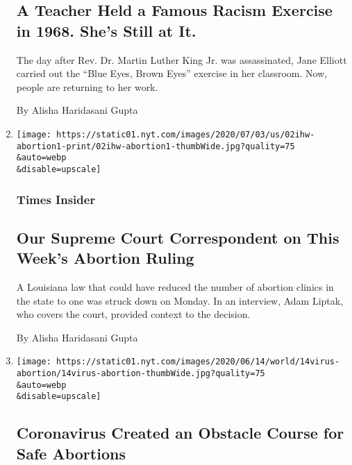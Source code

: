 \begin{enumerate}
  \hypertarget{a-teacher-held-a-famous-racism-exercise-in-1968-shes-still-at-it}{%
  \subsection{A Teacher Held a Famous Racism Exercise in 1968. She's
  Still at
  It.}\label{a-teacher-held-a-famous-racism-exercise-in-1968-shes-still-at-it}}

  The day after Rev. Dr. Martin Luther King Jr. was assassinated, Jane
  Elliott carried out the ``Blue Eyes, Brown Eyes'' exercise in her
  classroom. Now, people are returning to her work.

  By Alisha Haridasani Gupta
\item
  \href{/2020/07/03/insider/our-supreme-court-correspondent-on-this-weeks-abortion-ruling.html}{}

  \texttt{[image: https://static01.nyt.com/images/2020/07/03/us/02ihw-abortion1-print/02ihw-abortion1-thumbWide.jpg?quality=75\\\&auto=webp\\\&disable=upscale]}

  \hypertarget{times-insider}{%
  \subsubsection{Times Insider}\label{times-insider}}

  \hypertarget{our-supreme-court-correspondent-on-this-weeks-abortion-ruling}{%
  \subsection{Our Supreme Court Correspondent on This Week's Abortion
  Ruling}\label{our-supreme-court-correspondent-on-this-weeks-abortion-ruling}}

  A Louisiana law that could have reduced the number of abortion clinics
  in the state to one was struck down on Monday. In an interview, Adam
  Liptak, who covers the court, provided context to the decision.

  By Alisha Haridasani Gupta
\item
  \href{/2020/06/14/world/europe/coronavirus-abortion-obstacles.html}{}

  \texttt{[image: https://static01.nyt.com/images/2020/06/14/world/14virus-abortion/14virus-abortion-thumbWide.jpg?quality=75\\\&auto=webp\\\&disable=upscale]}

  \hypertarget{coronavirus-created-an-obstacle-course-for-safe-abortions}{%
  \subsection{Coronavirus Created an Obstacle Course for Safe
  Abortions}\label{coronavirus-created-an-obstacle-course-for-safe-abortions}}


\end{enumerate}
